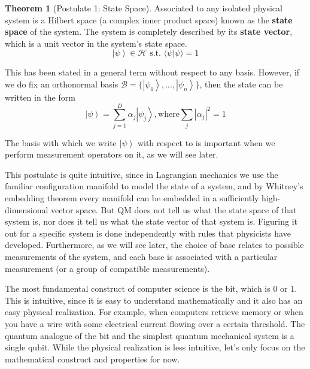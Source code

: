 \documentclass{article}
\newcommand{\ket}[1]{\ensuremath{\left|#1\right\rangle}}
\newcommand{\bracket}[2]{\langle #1 | #2 \rangle}
\theoremstyle{definition}
\newtheorem{theorem}{Theorem}[section]
\begin{document}
    \begin{theorem}[Postulate 1: State Space]
      Associated to any isolated physical system is a Hilbert space (a complex inner product space) known as the \textbf{state space} of the system. The system is completely described by its \textbf{state vector}, which is a unit vector in the system's state space. 
      \begin{equation}
        \ket{\psi} \in \mathcal{H} \text{ s.t. } \bracket{\psi}{\psi} = 1 
        \label{eq:state_vector}
      \end{equation}
        
      This has been stated in a general term without respect to any basis. However, if we do fix an orthonormal basis $\mathcal{B} = \{\ket{\psi_1}, \ldots, \ket{\psi_n}\}$, then the state can be written in the form 
      \begin{equation}
        \ket{\psi} = \sum_{j=1}^D \alpha_j \ket{\psi_j}, \text{where} \sum_{j} |\alpha_j|^2 = 1 
        \label{eq:pos_1}
      \end{equation}

      The basis with which we write $\ket{\psi}$ with respect to is important when we perform measurement operators on it, as we will see later. 
    \end{theorem}

    This postulate is quite intuitive, since in Lagrangian mechanics we use the familiar configuration manifold to model the state of a system, and by Whitney's embedding theorem every manifold can be embedded in a sufficiently high-dimensional vector space. But QM does not tell us what the state space of that system is, nor does it tell us what the state vector of that system is. Figuring it out for a specific system is done independently with rules that physicists have developed. Furthermore, as we will see later, the choice of base relates to possible measurements of the system, and each base is associated with a particular measurement (or a group of compatible measurements). 
    \par 

    The most fundamental construct of computer science is the bit, which is $0$ or $1$. This is intuitive, since it is easy to understand mathematically and it also has an easy physical realization. For example, when computers retrieve memory or when you have a wire with some electrical current flowing over a certain threshold. The quantum analogue of the bit and the simplest quantum mechanical system is a single qubit. While the physical realization is less intuitive, let's only focus on the mathematical construct and properties for now. 
\end{document}
